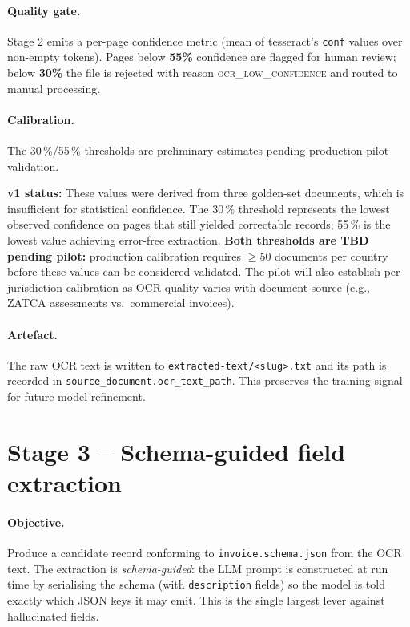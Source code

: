 \documentclass[11pt,a4paper,twoside]{report}
\newcommand{\corpus}{}
\begin{document}
\paragraph{Quality gate.} Stage 2 emits a per-page confidence metric
(mean of tesseract's \texttt{conf} values over non-empty tokens). Pages
below \textbf{55\%} confidence are flagged for human review; below
\textbf{30\%} the file is rejected with reason \textsc{ocr\_low\_confidence}
and routed to manual processing.

\paragraph{Calibration.} The 30\,\%/55\,\% thresholds are preliminary
estimates pending production pilot validation.

\textbf{v1 status:} These values were derived from three golden-set documents,
which is insufficient for statistical confidence. The 30\,\% threshold represents
the lowest observed confidence on pages that still yielded correctable records;
55\,\% is the lowest value achieving error-free extraction. \textbf{Both thresholds
are TBD pending pilot:} production calibration requires $\geq$50 documents per
country before these values can be considered validated. The pilot will also
establish per-jurisdiction calibration as OCR quality varies with document source
(e.g., ZATCA assessments vs.\ commercial invoices).

\paragraph{Artefact.} The raw OCR text is written to
\corpus\texttt{extracted-text/<slug>.txt} and its path is recorded
in \texttt{source\_document.ocr\_text\_path}. This preserves the
training signal for future model refinement.

\section{Stage 3 -- Schema-guided field extraction}

\paragraph{Objective.} Produce a candidate record conforming to
\texttt{invoice.schema.json} from the OCR text. The extraction is
\emph{schema-guided}: the LLM prompt is constructed at run time by
serialising the schema (with \texttt{description} fields) so the
model is told exactly which JSON keys it may emit. This is the
single largest lever against hallucinated fields.
\end{document}
